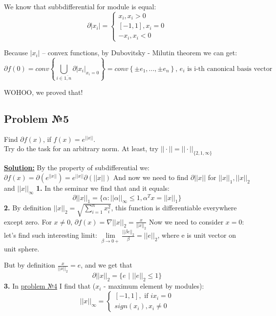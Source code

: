 We know that subbdifferential for module is equal:
\begin{equation*}
    \partial |x_i| = \begin{cases} 
    x_i, x_i > 0\\
    [-1, 1], x_i = 0 \\
    -x_i, x_i < 0
    \end{cases}
\end{equation*}

Because $|x_i|$ -- convex functions, by Dubovitsky - Milutin theorem we can get:
\begin{equation*}
    \partial f(0) = conv \left\{ \bigcup\limits_{i \in \overline{1, n}} \partial|x_i|_{x_i = 0} \right\} = conv \left\{\pm e_1, ..., \pm e_n\right\}\text{, } e_i \text{ is i-th canonical basis vector}
\end{equation*}

WOHOO, we proved that!

\subsection{Problem №5}
Find $\partial f(x)$, if $f(x) = e^{||x||}$. \\Try do the task for an arbitrary norm. At least, try $||\cdot || = ||\cdot||_{\{2, 1, \infty \}}$

\underline{\textbf{Solution:}}
\newline
By the property of subdifferential we: $\partial f(x) = \partial(e^{||x||}) = e^{||x||} \partial(||x||)$
\newline
And now we need to find $\partial ||x||$ for $||x||_1, ||x||_2$ and $||x||_{\infty}$
\newline
\textbf{1.}
In the seminar we find that and it equals: 
\begin{equation*}
\partial||x||_1 = \{\alpha : ||\alpha||_{\infty} \leq 1, \alpha^Tx = ||x||_1\}
\end{equation*}
\newline
\textbf{2.}
By definition $||x||_2 = \sqrt{\sum\limits_{i = 1}^n x_i^2}$, this function is differentiable everywhere except zero. 
\newline
For $x \not = 0$, $\partial f(x) = \nabla ||x||_2 =\frac{x}{||x||_2}$
\newline
Now we need to consider $x = 0$: let's find such interesting limit: $\lim\limits_{\beta \xrightarrow{} 0+} \frac{||\beta e||_2}{\beta} = ||e||_2$, where e is unit vector on unit sphere.

But by definition $\frac{x}{||x||_2} = e$,  and we get that 
\begin{equation*}
\partial ||x||_2 = \{e \text{ | } ||e||_2 \leq 1 \}    
\end{equation*}
\newline
\textbf{3.}
In \underline{problem №4} I find that ($x_i$ - maximum element by modules):
\begin{equation*}
    ||x||_{\infty} = \begin{cases}
            [-1, 1], \text{ if } i x_i = 0 \\
            sign(x_i), x_i \not = 0
    \end{cases}
\end{equation*}

